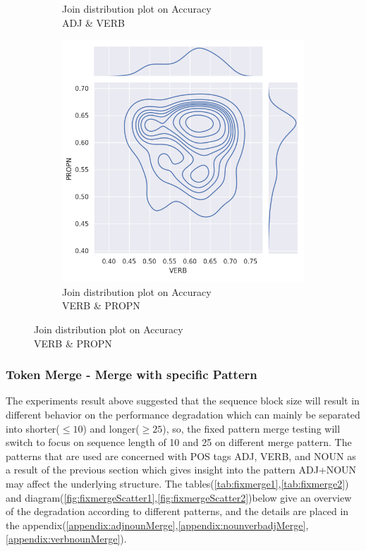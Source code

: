\documentclass[12pt]{article}
\begin{document}
\begin{figure} [!h]
\begin{subfigure}[h]{0.3\linewidth}
\caption{Join distribution plot on Accuracy\\ADJ \& VERB}
\end{subfigure}
\hfill
\begin{subfigure}[h]{0.3\linewidth}
\includegraphics[width=\linewidth]{figures/merge_verb_propn_joinplot.png}
\caption{Join distribution plot on Accuracy\\VERB \& PROPN}
\label{fig:displot1}
\end{subfigure}
\end{figure}
\newpage
\subsubsection{Token Merge - Merge with specific Pattern }
The experiments result above suggested that the sequence block size will result in different behavior on the performance degradation which can mainly be separated into shorter($\leq10$) and longer($\geq25$), so, the fixed pattern merge testing will switch to focus on sequence length of 10 and 25 on different merge pattern. The patterns that are used are concerned with POS tags ADJ, VERB, and NOUN as a result of the previous section which gives insight into the pattern ADJ+NOUN may affect the underlying structure. The tables(\ref{tab:fixmerge1},\ref{tab:fixmerge2}) and diagram(\ref{fig:fixmergeScatter1},\ref{fig:fixmergeScatter2})below give an overview of the degradation according to different patterns, and the details are placed in the appendix(\ref{appendix:adjnounMerge},\ref{appendix:nounverbadjMerge},\ref{appendix:verbnounMerge}).
\end{document}
